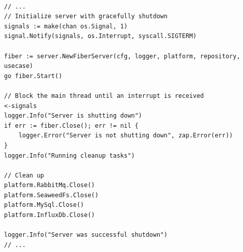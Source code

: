 \documentclass[12pt,one side,openright,a4paper]{cpe-thesis-th}
\begin{document}
 \\
\begin{lstlisting}[label={lst:appendix-k8s-sigterm}, caption={ตัวอย่างการปิดซอฟต์แวร์อย่างราบรื่น}]
// ...
// Initialize server with gracefully shutdown
signals := make(chan os.Signal, 1)
signal.Notify(signals, os.Interrupt, syscall.SIGTERM)

fiber := server.NewFiberServer(cfg, logger, platform, repository, usecase)
go fiber.Start()

// Block the main thread until an interrupt is received
<-signals
logger.Info("Server is shutting down")
if err := fiber.Close(); err != nil {
    logger.Error("Server is not shutting down", zap.Error(err))
}
logger.Info("Running cleanup tasks")

// Clean up
platform.RabbitMq.Close()
platform.SeaweedFs.Close()
platform.MySql.Close()
platform.InfluxDb.Close()

logger.Info("Server was successful shutdown")
// ...
\end{lstlisting}
\pagebreak
\end{document}
